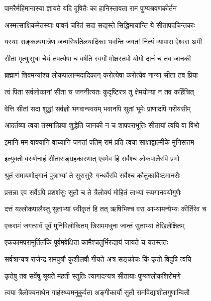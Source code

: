 \twolineshloka
{पामरैर्महिमानास्या ज्ञायते यदि दूषितैः}
{का हानिस्तावता राम पुण्यश्रवणकीर्तन}%

\twolineshloka
{अस्मत्साक्षिकमेतस्याः पावनं चरितं सदा}
{सद्यस्ते सिद्धिमायान्ति ये सीतापदचिन्तकाः}%

\twolineshloka
{यस्याः सङ्कल्पमात्रेण जन्मस्थितिलयादिकाः}
{भवन्ति जगतां नित्यं व्यापारा ऐश्वरा अमी}%

\twolineshloka
{सीता मृत्युःसुधा चेयं तपत्येषा च वर्षति}
{स्वर्गो मोक्षस्तपो योगो दानं च तव जानकी}%

\twolineshloka
{ब्रह्माणं शिवमन्यांश्च लोकपालान्मदादिकान्}
{करोत्येषा करोत्येव नान्या सीता तव प्रिया}%

\twolineshloka
{त्वं पिता सर्वलोकानां सीता च जननीत्यतः}
{कुदृष्टिरत्र तु क्षेमयोग्या न तव कर्हिचित्}%

\twolineshloka
{वेत्ति सीतां सदा शुद्धां सर्वज्ञो भगवान्स्वयम्}
{भवानपि सुतां भूमेः प्राणादपि गरीयसीम्}%

\twolineshloka
{आदर्तव्या त्वया तस्मात्प्रिया शुद्धेति जानकी}
{न च शापपराभूतिः सीतायां त्वयि वा विभो}%

\twolineshloka
{इमानि मम वाक्यानि वाच्यानि जगतां पतिम्}
{रामं प्रति त्वया साक्षाद्वाल्मीके मुनिसत्तम}%

\twolineshloka
{इत्युक्तो वरुणेनाहं सीतासङ्ग्रहकारणात्}
{एवमेव हि सर्वैश्च लोकपालैरपि प्रभो}%

\twolineshloka
{श्रुतं रामायणोद्गानं पुत्राभ्यां ते सुरासुरैः}
{गन्धर्वैरपि सर्वैश्च कौतुकाविष्टमानसैः}%

\twolineshloka
{प्रसन्ना एव सर्वेऽपि प्रशशंसुः सुतौ च ते}
{त्रैलोक्यं मोहितं ताभ्यां रूपगानवयोगुणैः}%

\twolineshloka
{दत्तं यल्लोकपालैस्तु सुताभ्यां स्वीकृतं हि तत्}
{ऋषिभिश्च वरा आभ्यामन्येभ्यः कीर्तिरेव च}%

\twolineshloka
{एकरामं जगत्सर्वं पूर्वं मुनिविलोकितम्}
{त्रिराममधुना जान्तं सुताभ्यां तेखिलेक्षितम्}%

\twolineshloka
{एककामपरामूर्तिर्लोके पूर्वमवेक्षिता}
{कामैश्चतुर्भिरद्यायं जायते च यतस्ततः}%

\twolineshloka
{सर्वत्रान्यत्र राजेन्द्र रामपुत्रौ कुशीलवौ}
{गीयते अत्र सङ्कोचः किं कृतो विदुषि त्वयि}%

\twolineshloka
{कृतेषु तव सर्वेषु श्रूयते महती स्तुतिः}
{त्यागादन्यत्र सीतायाः पुण्यश्लोकशिरोमणे}%

\twolineshloka
{त्वया त्रैलोक्यनाथेन गार्हस्थ्यमनुकुर्वता}
{अङ्गीकार्यौ सुतौ रामविद्याशीलगुणान्वितौ}%

